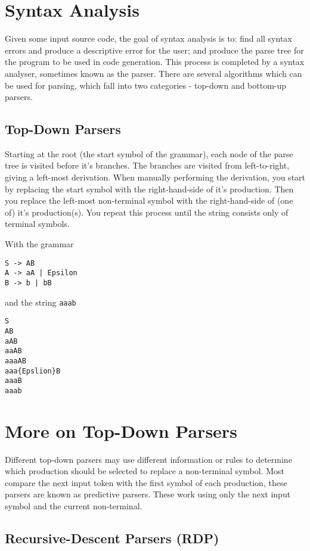 \section*{Syntax Analysis}

Given some input source code, the goal of syntax analysis is to: find all syntax errors and produce a descriptive error
 for the user; and produce the parse tree for the program to be used in code generation. This process is completed by a
 syntax analyser, sometimes known as the parser. There are several algorithms which can be used for parsing, which fall
 into two categories - top-down and bottom-up parsers.

\subsection*{Top-Down Parsers}

Starting at the root (the start symbol of the grammar), each node of the parse tree is visited before it's branches.
 The branches are visited from left-to-right, giving a left-most derivation. When manually performing the derivation,
 you start by replacing the start symbol with the right-hand-side of it's production. Then you replace the left-most
 non-terminal symbol with the right-hand-side of (one of) it's production(s). You repeat this process until the string
 consists only of terminal symbols.

With the grammar
\begin{verbatim}
S -> AB
A -> aA | Epsilon
B -> b | bB
\end{verbatim}
and the string \verb`aaab`
\begin{verbatim}
S
AB
aAB
aaAB
aaaAB
aaa{Epslion}B
aaaB
aaab
\end{verbatim}

\section*{More on Top-Down Parsers}

Different top-down parsers may use different information or rules to determine which production should be selected to
 replace a non-terminal symbol. Most compare the next input token with the first symbol of each production, these
 parsers are known as predictive parsers. These work using only the next input symbol and the current non-terminal.

\subsection*{Recursive-Descent Parsers (RDP)}

